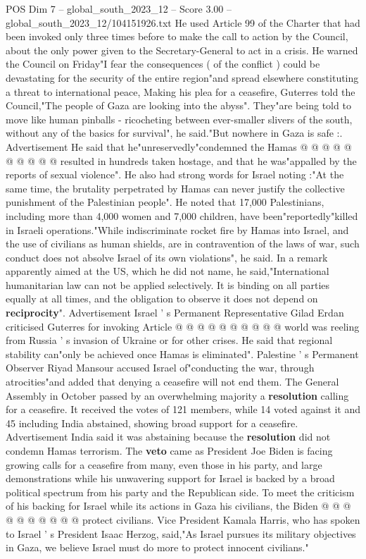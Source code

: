 \begin{textsample}{POS Dim 7 – global\_south\_2023\_12 – Score 3.00 – global\_south\_2023\_12/104151926.txt}
He used Article 99 of the Charter that had been invoked only three times before to make the call to action by the Council, about the only power given to the Secretary-General to act in a crisis.
He warned the Council on Friday"I fear the consequences ( of the conflict ) could be devastating for the security of the entire region"and spread elsewhere constituting a threat to international peace, Making his plea for a ceasefire, Guterres told the Council,"The people of Gaza are looking into the abyss".
They"are being told to move like human pinballs - ricocheting between ever-smaller slivers of the south, without any of the basics for survival", he said."But nowhere in Gaza is safe :.
Advertisement He said that he"unreservedly"condemned the Hamas @ @ @ @ @ @ @ @ @ @ resulted in hundreds taken hostage, and that he was"appalled by the reports of sexual violence".
He also had strong words for Israel noting :"At the same time, the brutality perpetrated by Hamas can never justify the collective punishment of the Palestinian people".
He noted that 17,000 Palestinians, including more than 4,000 women and 7,000 children, have been"reportedly"killed in Israeli operations."While indiscriminate rocket fire by Hamas into Israel, and the use of civilians as human shields, are in contravention of the laws of war, such conduct does not absolve Israel of its own violations", he said.
In a remark apparently aimed at the US, which he did not name, he said,"International humanitarian law can not be applied selectively.
It is binding on all parties equally at all times, and the obligation to observe it does not depend on \textbf{reciprocity}".
Advertisement Israel ' s Permanent Representative Gilad Erdan criticised Guterres for invoking Article @ @ @ @ @ @ @ @ @ @ world was reeling from Russia ' s invasion of Ukraine or for other crises.
He said that regional stability can"only be achieved once Hamas is eliminated".
Palestine ' s Permanent Observer Riyad Mansour accused Israel of"conducting the war, through atrocities"and added that denying a ceasefire will not end them.
The General Assembly in October passed by an overwhelming majority a \textbf{resolution} calling for a ceasefire.
It received the votes of 121 members, while 14 voted against it and 45 including India abstained, showing broad support for a ceasefire.
Advertisement India said it was abstaining because the \textbf{resolution} did not condemn Hamas terrorism.
The \textbf{veto} came as President Joe Biden is facing growing calls for a ceasefire from many, even those in his party, and large demonstrations while his unwavering support for Israel is backed by a broad political spectrum from his party and the Republican side.
To meet the criticism of his backing for Israel while its actions in Gaza his civilians, the Biden @ @ @ @ @ @ @ @ @ @ protect civilians.
Vice President Kamala Harris, who has spoken to Israel ' s President Isaac Herzog, said,"As Israel pursues its military objectives in Gaza, we believe Israel must do more to protect innocent civilians."

\end{textsample}

